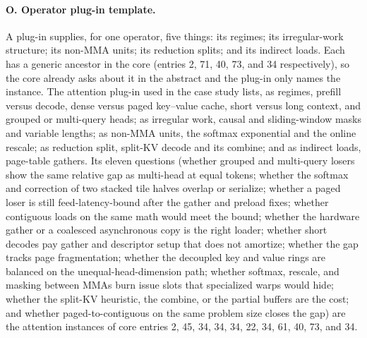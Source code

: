 \paragraph{O. Operator plug-in template.}
A plug-in supplies, for one operator, five things: its regimes; its irregular-work structure; its
non-MMA units; its reduction splits; and its indirect loads. Each has a generic ancestor in the core
(entries 2, 71, 40, 73, and 34 respectively), so the core already asks about it in the abstract and
the plug-in only names the instance. The attention plug-in used in the case study lists, as regimes,
prefill versus decode, dense versus paged key--value cache, short versus long context, and grouped
or multi-query heads; as irregular work, causal and sliding-window masks and variable lengths; as
non-MMA units, the softmax exponential and the online rescale; as reduction split, split-KV decode
and its combine; and as indirect loads, page-table gathers. Its eleven questions (whether grouped
and multi-query losers show the same relative gap as multi-head at equal tokens; whether the
softmax and correction of two stacked tile halves overlap or serialize; whether a paged loser is
still feed-latency-bound after the gather and preload fixes; whether contiguous loads on the same
math would meet the bound; whether the hardware gather or a coalesced asynchronous copy is the right
loader; whether short decodes pay gather and descriptor setup that does not amortize; whether the
gap tracks page fragmentation; whether the decoupled key and value rings are balanced on the
unequal-head-dimension path; whether softmax, rescale, and masking between MMAs burn issue slots
that specialized warps would hide; whether the split-KV heuristic, the combine, or the partial
buffers are the cost; and whether paged-to-contiguous on the same problem size closes the gap) are
the attention instances of core entries 2, 45, 34, 34, 34, 22, 34, 61, 40, 73, and 34.

